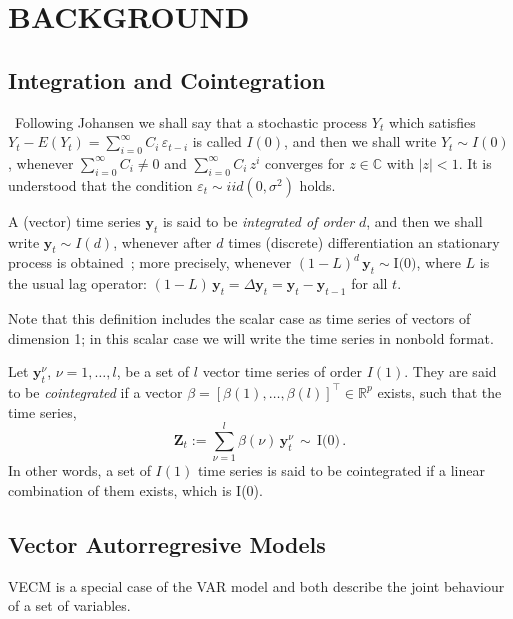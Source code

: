 \section{\uppercase{Background}}
\label{sec:background}
\noindent

\subsection{Integration and Cointegration}\label{sec:coint}\  
Following Johansen \cite{johansen1995} we shall say that a stochastic process
$Y_t$ which satisfies $Y_t-E(Y_t) = \sum_{i=0}^\infty C_i\,\varepsilon_{t-i}$ is
called $I(0)$, and then we shall write $Y_t\sim I(0)$, whenever
$\sum_{i=0}^\infty C_i \neq 0$ and $\sum_{i=0}^\infty C_i\,z^i$ converges for
$z\in\mathbb{C}$ with $|z|<1$.  It is understood that the condition
$\varepsilon_t\sim iid(0,\sigma^2)$ holds.

A (vector) time series $\mathbf{y}_t$ is said to be {\em integrated of order\/}
$d$, and then we shall write $\mathbf{y}_t\sim I(d)$, whenever after $d$ times
(discrete) differentiation an stationary process is obtained~\cite{banerjee1993};
more precisely, whenever
$(1-L)^d\,\mathbf{y}_t\sim\text{I(0)}$, where $L$ is the usual lag operator:
$(1-L)\,\mathbf{y}_t = \Delta\mathbf{y}_t = \mathbf{y}_t-\mathbf{y}_{t-1}$ for
all $t$.  

Note that this definition includes the scalar case as time series of
vectors of dimension 1; in this scalar case we will write the time series in
nonbold format.

Let $\mathbf{y}_t^\nu$, $\nu=1,\dots,l$, be a set of $l$ vector time series of
order $I(1)$.  They are said to be {\em cointegrated\/} if a vector
$\beta=[\beta(1),\dots,\beta(l)]^\top \in \mathbb{R}^p$ exists, such that the
time series,
\begin{equation}
\mathbf{Z}_t:= 
\sum_{\nu=1}^l \beta(\nu)\,\mathbf{y}_t^\nu\,\sim\,\text{I(0)}\,.
\end{equation}
In other words, a set of $I(1)$ time series is said to be cointegrated if a
linear combination of them exists, which is I(0).


\subsection{Vector Autorregresive Models}\label{sec:varvec}

VECM is a special case of the VAR \cite{sims1980} model and both describe the joint behaviour
of a set of variables.

